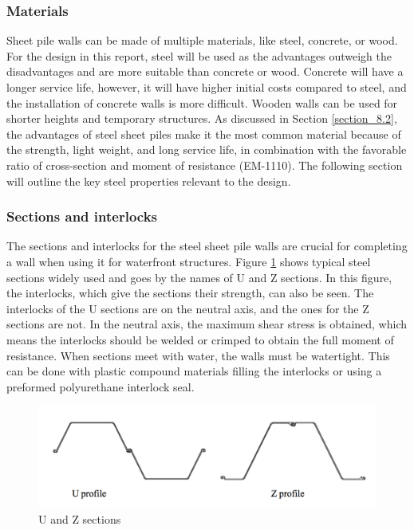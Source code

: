 
\subsubsection{Materials}

Sheet pile walls can be made of multiple materials, like steel, concrete, or wood. For the design in this report, steel will be used as the advantages outweigh the disadvantages and are more suitable than concrete or wood. Concrete will have a longer service life, however, it will have higher initial costs compared to steel, and the installation of concrete walls is more difficult. Wooden walls can be used for shorter heights and temporary structures.  As discussed in Section \ref{section_8.2}, the advantages of steel sheet piles make it the most common material because of the strength, light weight, and long service life, in combination with the favorable ratio of cross-section and moment of resistance (EM-1110). The following section will outline the key steel properties relevant to the design.

\subsubsection{Sections and interlocks}

The sections and interlocks for the steel sheet pile walls are crucial for completing a wall when  using it for waterfront structures. Figure \ref{fig:sections_sheetpiles} shows typical steel sections widely used and goes by the names of U and Z sections. In this figure, the interlocks, which give the sections their strength, can also be seen. The interlocks of the U sections are on the neutral axis, and the ones for the Z sections are not. In the neutral axis, the maximum shear stress is obtained, which means the interlocks should be welded or crimped to obtain the full moment of resistance. When sections meet with water, the walls must be watertight. This can be done with plastic compound materials filling the interlocks or using a preformed polyurethane interlock seal. 


\begin{figure}[H]
    \centering
    \includegraphics[width=0.50\linewidth]{figures/ch8/u_profile_z_profile.png}
    \caption{U and Z sections}
    \label{fig:sections_sheetpiles}
\end{figure}


